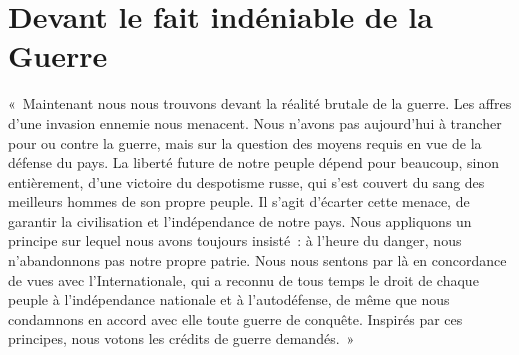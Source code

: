 \documentclass[french,twoside]{book} %
\newenvironment{quoteblock}%
  {\begin{quoting}}
  {\end{quoting}}
\newenvironment{quotebar}{%
    \def\FrameCommand{{\color{rubric!10!}\vrule width 0.5em} \hspace{0.9em}}%
    \def\OuterFrameSep{\itemsep} %
    \MakeFramed {\advance\hsize-\width \FrameRestore}
  }%
  {%
    \endMakeFramed
  }
\renewenvironment{quoteblock}%
  {%
    \savenotes
    \setstretch{0.9}
    \normalfont
    \begin{quotebar}
  }
  {%
    \end{quotebar}
    \spewnotes
  }
\begin{document}
\section[{Devant le fait indéniable de la Guerre}]{Devant le fait indéniable de la Guerre}\renewcommand{\leftmark}{Devant le fait indéniable de la Guerre}


\begin{quoteblock}
 \noindent « Maintenant nous nous trouvons devant la réalité brutale de la guerre. Les affres d’une invasion ennemie nous menacent. Nous n’avons pas aujourd’hui à trancher pour ou contre la guerre, mais sur la question des moyens requis en vue de la défense du pays. La liberté future de notre peuple dépend pour beaucoup, sinon entièrement, d’une victoire du despotisme russe, qui s’est couvert du sang des meilleurs hommes de son propre peuple. Il s’agit d’écarter cette menace, de garantir la civilisation et l’indépendance de notre pays. Nous appliquons un principe sur lequel nous avons toujours insisté : à l’heure du danger, nous n’abandonnons pas notre propre patrie. Nous nous sentons par là en concordance de vues avec l’Internationale, qui a reconnu de tous temps le droit de chaque peuple à l’indépendance nationale et à l’autodéfense, de même que nous condamnons en accord avec elle toute guerre de conquête. Inspirés par ces principes, nous votons les crédits de guerre demandés. »
\end{quoteblock}
\end{document}
